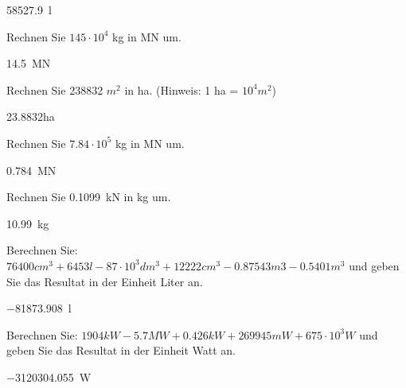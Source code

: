 \begin{questions}
\begin{solutionorbox}[3cm]
\SI{58527.9}{\litre}
\end{solutionorbox}



\question[1]
Rechnen Sie $145\cdot 10^4$ kg in \si{\mega\N} um.
\vspace*{0.1cm}

\begin{solutionorbox}[3cm]
\SI{14.5}{\mega\N}
\end{solutionorbox}



\question[2]
Rechnen Sie \num{238832} $m^2$ in ha. (Hinweis: 1 ha = $10^4 m^2$)
\vspace*{0.1cm}

\begin{solutionorbox}[3cm]
\num{23.8832}ha
\end{solutionorbox}


\question[1]
Rechnen Sie $7.84\cdot 10^5$ kg in \si{\mega\N} um.
\vspace*{0.1cm}

\begin{solutionorbox}[3cm]
\SI{0.784}{\mega\N}
\end{solutionorbox}


\question[1]
Rechnen Sie \SI{0.1099}{\kilo\N} in \si{\kilogram} um.
\vspace*{0.1cm}

\begin{solutionorbox}[3cm]
\SI{10.99}{\kg}
\end{solutionorbox}



\question[4]
Berechnen Sie:  $76400 cm^3 + 6453 l -87\cdot 10^3 dm^3 + 12222 cm^3-0.87543 m3 - 0.5401 m^3$ und geben Sie das Resultat in der Einheit Liter an.
\vspace*{0.1cm}

\begin{solutionorbox}[3cm]
\SI{-81873.908}{\litre}
\end{solutionorbox}


\question[4]
Berechnen Sie:  $1904 kW -5.7 MW + 0.426 kW + 269945 mW  + 675 \cdot 10^3 W $ und geben Sie das Resultat in der Einheit Watt an.
\vspace*{0.1cm}

\begin{solutionorbox}[3cm]
\SI{-3120304.055}{\watt}
\end{solutionorbox}

\end{questions}

